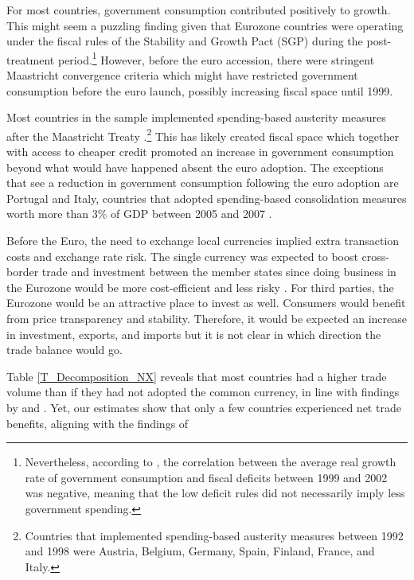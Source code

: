 \documentclass[12pt]{article}
\begin{document}
For most countries, government consumption contributed positively to growth. This might seem a puzzling finding given that Eurozone countries were operating under the fiscal rules of the Stability and Growth Pact (SGP) during the post-treatment period.\footnote{Nevertheless, according to \cite{Bofinger2003}, the correlation between the average real growth rate of government consumption and fiscal deficits between 1999 and 2002 was negative, meaning that the low deficit rules did not necessarily imply less government spending.} However, before the euro accession, there were stringent Maastricht convergence criteria which might have restricted government consumption before the euro launch, possibly increasing fiscal space until 1999.

Most countries in the sample implemented spending-based austerity measures after the Maastricht Treaty \citep{Alesina2019}.\footnote{Countries that implemented spending-based austerity measures between 1992 and 1998 were Austria, Belgium, Germany, Spain, Finland, France, and Italy.} This has likely created fiscal space which together with access to cheaper credit promoted an increase in government consumption beyond what would have happened absent the euro adoption. The exceptions that see a reduction in government consumption following the euro adoption are Portugal and Italy, countries that adopted spending-based consolidation measures worth more than 3\% of GDP between 2005 and 2007 \citep{Alesina2019}.


Before the Euro, the need to exchange local currencies implied extra transaction costs and exchange rate risk. The single currency was expected to boost cross-border trade and investment between the member states since doing business in the Eurozone would be more cost-efficient and less risky \cite{DeGrauwe2020}. For third parties, the Eurozone would be an attractive place to invest as well. Consumers would benefit from price transparency and stability. Therefore, it would be expected an increase in investment, exports, and imports but it is not clear in which direction the trade balance would go.

Table \ref{T_Decomposition_NX} reveals that most countries had a higher trade volume than if they had not adopted the common currency, in line with findings by \cite{Baldwin2008} and \cite{Schmitz2011}. Yet, our estimates show that only a few countries experienced net trade benefits, aligning with the findings of  \cite{Hope2016}
\end{document}
